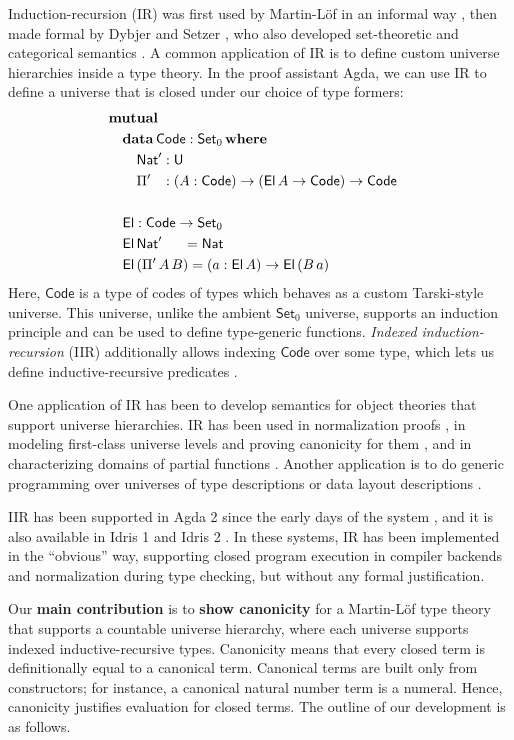 \documentclass[acmsmall,screen,review,anonymous]{acmart}
\newcommand{\msf}[1]{{\mathsf{#1}}}
\newcommand{\mbf}[1]{{\mathbf{#1}}}
\newcommand{\data}{\mbf{data}}
\newcommand{\U}{\msf{U}}
\newcommand{\Set}{\msf{Set}}
\newcommand{\where}{\mbf{where}}
\newcommand{\Nat}{\msf{Nat}}
\newcommand{\El}{\msf{El}}
\newcommand{\Code}{\msf{Code}}
\begin{document}
Induction-recursion (IR) was first used by Martin-Löf in an informal way \cite{TODO}, then made
formal by Dybjer and Setzer \cite{TODO}, who also developed set-theoretic and categorical semantics
\cite{TODO}. A common application of IR is to define custom universe hierarchies inside a type
theory. In the proof assistant Agda, we can use IR to define a universe that is closed under our
choice of type formers:
\begin{alignat*}{3}
  & \mbf{mutual} \\
  & \quad\data\,\Code : \Set_0\,\where \\
  & \quad\quad \Nat' : \U\\
  & \quad\quad \Pi' \hspace{0.8em} : (A : \Code) \to (\El\,A \to \Code) \to \Code
  & \\
  & \\
  & \quad\El : \Code \to \Set_0 \\
  & \quad\El\,\Nat'\hspace{1.5em}  = \Nat \\
  & \quad\El\,(\Pi'\,A\,B) = (a : \El\,A) \to \El\,(B\,a)
\end{alignat*}
Here, $\Code$ is a type of codes of types which behaves as a custom Tarski-style universe. This
universe, unlike the ambient $\Set_0$ universe, supports an induction principle and can be used to
define type-generic functions. \emph{Indexed induction-recursion} (IIR) additionally allows indexing
$\Code$ over some type, which lets us define inductive-recursive predicates \cite{TODO}.

One application of IR has been to develop semantics for object theories that support universe
hierarchies. IR has been used in normalization proofs \cite{TODO}, in modeling first-class universe
levels \cite{TODO} and proving canonicity for them \cite{TODO}, and in characterizing domains of
partial functions \cite{TODO}. Another application is to do generic programming over universes of
type descriptions \cite{TODO} or data layout descriptions \cite{TODO}.

IIR has been supported in Agda 2 since the early days of the system \cite{TODO}, and it is also
available in Idris 1 and Idris 2 \cite{TODO}. In these systems, IR has been implemented in the
``obvious'' way, supporting closed program execution in compiler backends and normalization during
type checking, but without any formal justification.

Our \textbf{main contribution} is to \textbf{show canonicity} for a Martin-Löf type theory that
supports a countable universe hierarchy, where each universe supports indexed inductive-recursive
types. Canonicity means that every closed term is definitionally equal to a canonical
term. Canonical terms are built only from constructors; for instance, a canonical natural number
term is a numeral. Hence, canonicity justifies evaluation for closed terms. The outline of our
development is as follows.
\end{document}
